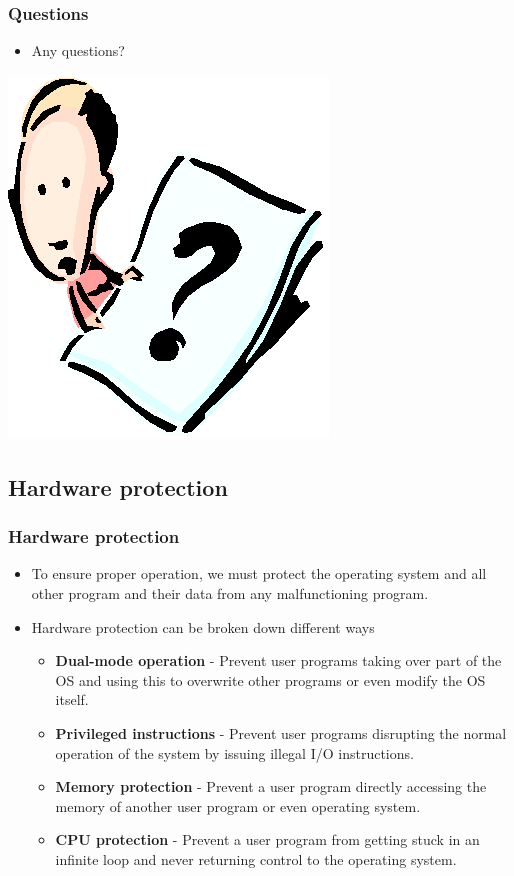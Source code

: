 \documentclass[CJKutf8,xcolor=pdftex,dvipsnames,table]{beamer}
\begin{document}
\begin{CJK*}{UTF8}{song}
  \begin{frame}
    \frametitle{Questions}
    \begin{itemize}
    \item{Any questions?}
    \end{itemize}
    \begin{center}
      \includegraphics[scale=.5]{question}
    \end{center}
  \end{frame}

  \subsection{Hardware protection}

  \begin{frame}
    \frametitle{Hardware protection} \pause
    \begin{itemize}
    \item{To ensure proper operation, we must protect the operating system and all other program and their data from any malfunctioning program.} \pause
    \item{Hardware protection can be broken down different ways} \pause
      \begin{itemize}
      \item{\textbf{Dual-mode operation} \pause - Prevent user programs taking over part of the OS and using this to overwrite other programs or even modify the OS itself.} \pause
      \item{\textbf{Privileged instructions} \pause - Prevent user programs disrupting the normal operation of the system by issuing illegal I/O instructions.} \pause
      \item{\textbf{Memory protection} \pause - Prevent a user program directly accessing the memory of another user program  or even operating system.} \pause
      \item{\textbf{CPU protection} \pause - Prevent a user program from getting stuck in an infinite loop and never returning control to the operating system.}
      \end{itemize}
    \end{itemize}
  \end{frame}


\end{CJK*}
\end{document}
